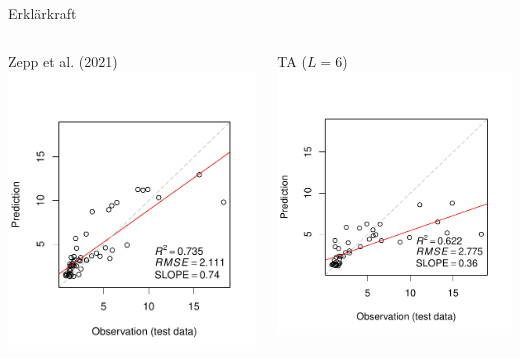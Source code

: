 \begin{frame}{Erklärkraft}
\begin{columns}
\column{5.5cm}
\begin{block}{Zepp et al. (2021)}
\centering\includegraphics[width=1\textwidth]{FIGURE/Figure_Model_Accuracy-testsite.pdf}
\end{block}
\column{5.5cm}
\begin{block}{\alert{TA} ($L=6$)}
\centering\includegraphics[width=1\textwidth]{FIGURE/Figure_Model_Accuracy_TA_L6.pdf}

\end{block}
\end{columns}
\end{frame}
